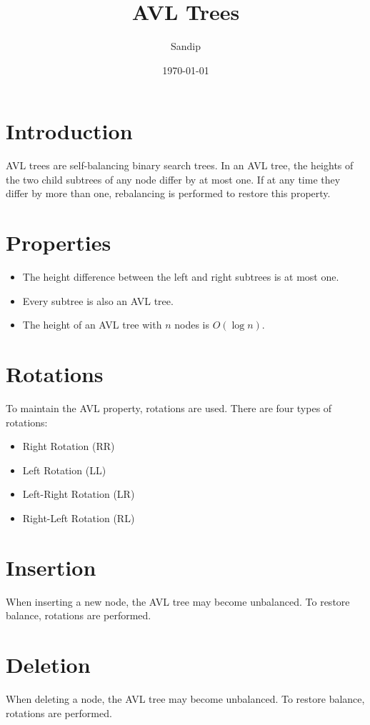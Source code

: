 \documentclass{article}
\title{AVL Trees}
\author{Sandip}
\date{\today}
\begin{document}
\maketitle

\section{Introduction}
AVL trees are self-balancing binary search trees. In an AVL tree, the heights of the two child subtrees of any node differ by at most one. If at any time they differ by more than one, rebalancing is performed to restore this property.

\section{Properties}
\begin{itemize}
  \item The height difference between the left and right subtrees is at most one.
  \item Every subtree is also an AVL tree.
  \item The height of an AVL tree with $n$ nodes is $O(\log n)$.
\end{itemize}

\section{Rotations}
To maintain the AVL property, rotations are used. There are four types of rotations:
\begin{itemize}
  \item Right Rotation (RR)
  \item Left Rotation (LL)
  \item Left-Right Rotation (LR)
  \item Right-Left Rotation (RL)
\end{itemize}

\section{Insertion}
When inserting a new node, the AVL tree may become unbalanced. To restore balance, rotations are performed.

\section{Deletion}
When deleting a node, the AVL tree may become unbalanced. To restore balance, rotations are performed.
\end{document}
